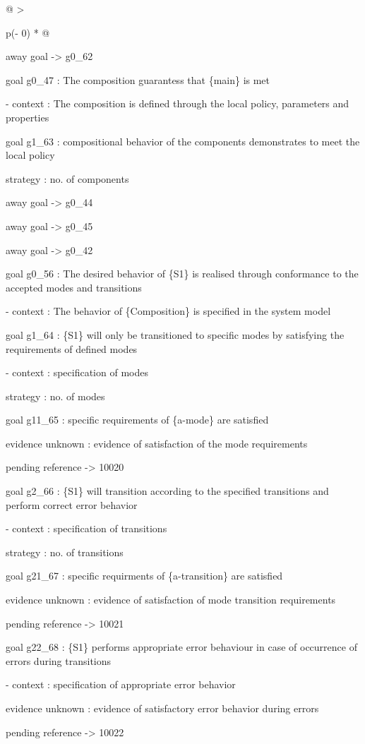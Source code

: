 \documentclass[12pt,twoside,a4paper]{article}
\begin{document}
\begin{longtable}[]{@{}
  >{\raggedright\arraybackslash}p{(\columnwidth - 0\tabcolsep) * }@{}}
\begin{minipage}[b]{\linewidth}
away goal -\textgreater{} g0\_62

goal g0\_47 : The composition guarantess that \{main\} is met

- context : The composition is defined through the local policy, parameters and properties

goal g1\_63 : compositional behavior of the components demonstrates to meet the local policy

strategy : no. of components

away goal -\textgreater{} g0\_44

away goal -\textgreater{} g0\_45

away goal -\textgreater{} g0\_42

goal g0\_56 : The desired behavior of \{S1\} is realised through conformance to the accepted modes and transitions

- context : The behavior of \{Composition\} is specified in the system model

goal g1\_64 : \{S1\} will only be transitioned to specific modes by satisfying the requirements of defined modes

- context : specification of modes

strategy : no. of modes

goal g11\_65 : specific requirements of \{a-mode\} are satisfied

evidence unknown : evidence of satisfaction of the mode requirements

pending reference -\textgreater{} 10020

goal g2\_66 : \{S1\} will transition according to the specified transitions and perform correct error behavior

- context : specification of transitions

strategy : no. of transitions

goal g21\_67 : specific requirments of \{a-transition\} are satisfied

evidence unknown : evidence of satisfaction of mode transition requirements

pending reference -\textgreater{} 10021

goal g22\_68 : \{S1\} performs appropriate error behaviour in case of occurrence of errors during transitions

- context : specification of appropriate error behavior

evidence unknown : evidence of satisfactory error behavior during errors

pending reference -\textgreater{} 10022


\end{minipage}
\end{longtable}
\end{document}
